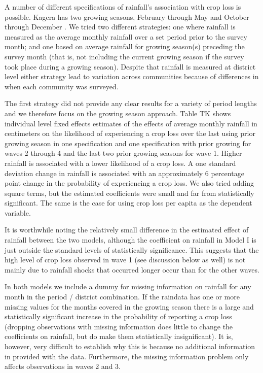 \documentclass[letterpaper,12pt]{article}
\begin{document}
\begin{enumerate}
A number of different specifications of rainfall's association with 
crop loss is possible.
Kagera has two growing seasons, February through May and
October through December \citep[p 6]{Tanzania2007}.
We tried two different strategies: 
one where rainfall is measured as the average monthly rainfall 
over a set period prior to the survey month; 
and one based on average rainfall for growing season(s) preceding 
the survey month 
(that is, not including the current growing season if the survey
took place during a growing season).
Despite that rainfall is measured at district level either strategy
lead to variation across communities because of differences in 
when each community was surveyed.

The first strategy did not provide any clear results for a variety
of period lengths and we therefore focus on the growing season approach.
Table TK shows individual level fixed effects estimates of the 
effects of average monthly rainfall in centimeters on the likelihood
of experiencing a crop loss over the last using prior growing season 
in one specification and one specification with prior growing for
waves 2 through 4 and the last two prior growing seasons for wave 1.
Higher rainfall is associated with a lower likelihood of a crop loss. 
A one standard deviation change in rainfall is associated with an
approximately 6 percentage point change in the probability of 
experiencing a crop loss.
We also tried adding square terms, but the estimated coefficients
were small and far from statistically significant.
The same is the case for using crop loss per capita as the dependent
variable. 

It is worthwhile noting the relatively small difference in the 
estimated effect of rainfall between the two models, 
although the coefficient on rainfall in Model I is just outside
the standard levels of statistically significance.
This suggests that the high level of crop loss observed in
wave 1 (see discussion below as well) is not mainly due to 
rainfall shocks that occurred longer occur than for the other waves.

In both models we include a dummy for missing information on rainfall 
for any month in the period / district combination.
If the raindata has one or more missing values for the months
covered in the growing season there is a large and statistically 
significant increase in the probability of reporting a crop loss
(dropping observations with missing information does little
to change the coefficients on rainfall, but do make them
statistically insignificant).
It is, however, very difficult to establish why this is because
no additional information in provided with the data.
Furthermore, the missing information problem only affects
observations in waves 2 and 3.


\end{enumerate}
\end{document}
